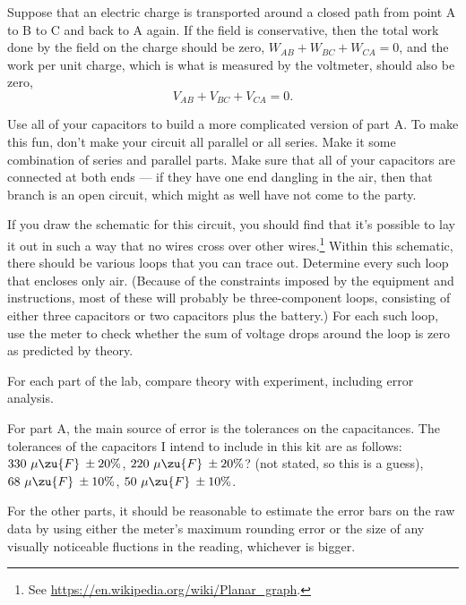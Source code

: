 Suppose that an electric charge is transported around a closed path from point A to B to C
and back to A again. If the field is conservative, then the total work done by the field
on the charge should be zero, $  W_{AB}+W_{BC}+W_{CA}=0$, and the work per unit charge,
which is what is measured by the voltmeter, should also be zero,
\begin{equation*}
  V_{AB}+V_{BC}+V_{CA}=0.
\end{equation*}

Use all of your capacitors to build a more complicated version of part A.
To make this fun, don't make your circuit all parallel or all series. Make it some
combination of series and parallel parts. Make sure that all of your capacitors are
connected at both ends --- if they have one end dangling in the air, then that branch
is an open circuit, which might as well have not come to the party.

If you draw the schematic for this circuit, you should find that it's possible to lay it
out in such a way that no wires cross over other wires.\footnote{See \url{https://en.wikipedia.org/wiki/Planar_graph}.}
Within this schematic, there should be various loops that you can trace out.
Determine every such loop that encloses only air. (Because of the constraints
imposed by the equipment and instructions, most of these will probably be
three-component loops, consisting of either three capacitors or two capacitors plus
the battery.) For each such loop, use the meter to check whether the sum of voltage
drops around the loop is zero as predicted by theory.



\analysis

For each part of the lab, compare theory with experiment, including error analysis.

For part A, the main source of error is the tolerances on
the capacitances.
The tolerances of the capacitors I intend to include in this kit are as
follows:
$330\ \mu\zu{F}\:\pm 20\%$,
$220\ \mu\zu{F}\:\pm 20\%$? (not stated, so this is a guess),
$68\ \mu\zu{F}\:\pm 10\%$,
$50\ \mu\zu{F}\:\pm 10\%$. 

For the other parts, it should be reasonable to estimate the error bars on the raw
data by using either the meter's maximum rounding error or the size of any visually
noticeable fluctions in the reading, whichever is bigger.

